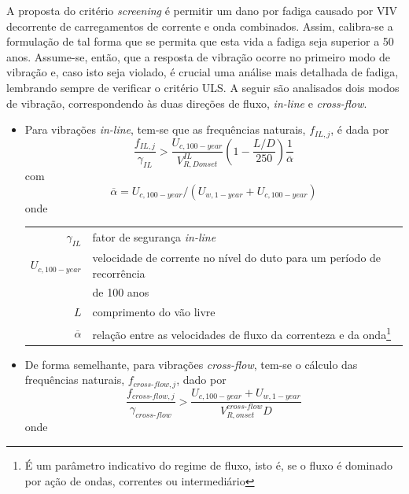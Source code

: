 A proposta do critério \textit{screening} é permitir um dano por fadiga causado por VIV decorrente de carregamentos de corrente e onda combinados.
Assim, calibra-se a formulação de tal forma que se permita que esta vida a fadiga seja superior a 50 anos.
Assume-se, então, que a resposta de vibração ocorre no primeiro modo de vibração e, caso isto seja violado, é crucial uma análise mais detalhada de fadiga, lembrando sempre de verificar o critério ULS.
A seguir são analisados dois modos de vibração, correspondendo às duas direções de fluxo, \textit{in-line} e \textit{cross-flow}.

\begin{itemize}
	\item Para vibrações \textit{in-line}, tem-se que as frequências naturais, $f_{\mathit{IL},j}$, é dada por
	\begin{equation}
	\label{eq:viv-eqil}
	\frac{f_{\mathit{IL},j}}{\gamma_\mathit{IL}} > \frac{U_{c,100-\mathit{year}}}{V_{R, D \mathit{onset}}^\mathit{IL}} \left( 1 - \frac{L/D}{250}\right) \frac{1}{\overline{\alpha}}
	\end{equation}
	com
	\begin{equation}
	\overline{\alpha} = {U_{c,100-\mathit{year}}}/{(U_{w,1-\mathit{year}} + U_{c,100-\mathit{year}})}
	\end{equation}
	onde

	\begin{tabular}{rl}
		$\gamma_\mathit{IL}$      & fator de segurança \textit{in-line}\\
		$U_{c,100-\mathit{year}}$ & velocidade de corrente no nível do duto para um período de recorrência \\
		                          & de 100 anos\\
		$L$                       & comprimento do vão livre\\
		$\overline{\alpha}$       & relação entre as velocidades de fluxo da correnteza e da onda\footnote{É um parâmetro indicativo do regime de fluxo, isto é, se o fluxo é dominado por ação de ondas, correntes ou intermediário}
	\end{tabular}

	\item De forma semelhante, para vibrações \textit{cross-flow}, tem-se o cálculo das frequências naturais, $f_{\mathit{\textit{cross-flow}},j}$, dado por
	\begin{equation}
	\label{eq:viv-eqcf}
	\frac{f_{\mathit{\textit{cross-flow}},j}}{\gamma_\mathit{\textit{cross-flow}}} > \frac{U_{c,100-\mathit{year}} + U_{w,1-\mathit{year}}}{ V_{R,\mathit{onset}}^{\mathit{\textit{cross-flow}}} D}
	\end{equation}
	onde


\end{itemize}
